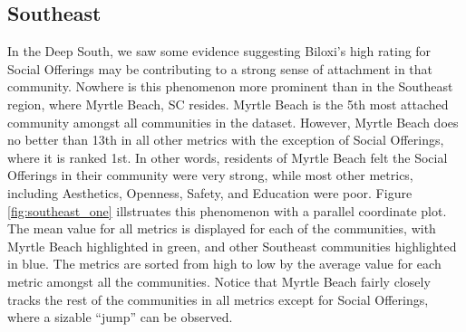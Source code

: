 \documentclass[11pt]{article}\usepackage{knitr}
\begin{document}
\subsection*{Southeast}
In the Deep South, we saw some evidence suggesting Biloxi's high rating for Social Offerings may be contributing to a strong sense of attachment in that community. Nowhere is this phenomenon more prominent than in the Southeast region, where Myrtle Beach, SC resides. Myrtle Beach is the 5th most attached community amongst all communities in the dataset. However, Myrtle Beach does no better than 13th in all other metrics with the exception of Social Offerings, where it is ranked 1st. In other words, residents of Myrtle Beach felt the Social Offerings in their community were very strong, while most other metrics, including Aesthetics, Openness, Safety, and Education were poor. Figure \ref{fig:southeast_one} illstruates this phenomenon with a parallel coordinate plot. The mean value for all metrics is displayed for each of the communities, with Myrtle Beach highlighted in green, and other Southeast communities highlighted in blue. The metrics are sorted from high to low by the average value for each metric amongst all the communities. Notice that Myrtle Beach fairly closely tracks the rest of the communities in all metrics except for Social Offerings, where a sizable ``jump'' can be observed.
\end{document}
